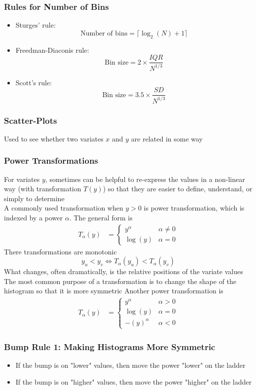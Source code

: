\documentclass[11pt]{article}
\begin{document}
\subsubsection*{Rules for Number of Bins}
\begin{itemize}
    \item Sturges' rule: \[\text{Number of bins} = \lceil \log_2(N) + 1\rceil\]
    \item Freedman-Diaconis rule: \[\text{Bin size} = 2\times\frac{IQR}{N^{1/3}}\]
    \item Scott's rule: \[\text{Bin size} = 3.5\times\frac{SD}{N^{1/3}}\]
\end{itemize}
\subsubsection*{Scatter-Plots}
Used to see whether two variates $x$ and $y$ are related in some way 
\subsubsection{Power Transformations}
For variates $y$, sometimes can be helpful to re-express the values in a non-linear way (with transformation $T(y)$) so that they are easier to define, understand, or simply to determine \\
A commonly used transformation when $y>0$ is power transformation, which is indexed by a power $\alpha$. The general form is 
\begin{align*}
    T_\alpha(y) &=
    \begin{cases}
        y^\alpha &\alpha\neq 0 \\
        \log(y) &\alpha=0
    \end{cases}
\end{align*}
There transformations are monotonic 
\[y_u<y_v\iff T_\alpha(y_u)<T_\alpha(y_v)\]
What changes, often dramatically, is the relative positions of the variate values \\
The most common purpose of a transformation is to change the shape of the histogram so that it is more symmetric 
Another power transformation is 
\begin{align*}
    T_\alpha(y) &=
    \begin{cases}
        y^\alpha &\alpha>0 \\
        \log(y) &\alpha=0 \\
        -(y)^\alpha &\alpha<0
    \end{cases}
\end{align*}
\subsubsection*{Bump Rule 1: Making Histograms More Symmetric}
\begin{itemize}
    \item If the bump is on "lower" values, then move the power "lower" on the ladder 
    \item If the bump is on "higher" values, then move the power "higher" on the ladder 
\end{itemize}
\end{document}
